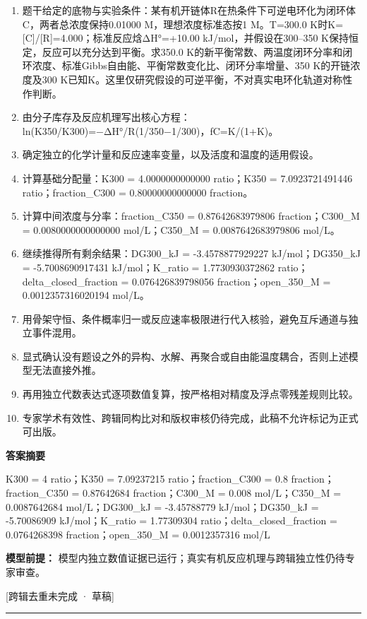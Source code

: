\documentclass[UTF8,11pt,a4paper]{ctexart}
\begin{document}
\begin{enumerate}
\item 题干给定的底物与实验条件：某有机开链体R在热条件下可逆电环化为闭环体C，两者总浓度保持0.01000 M，理想浓度标准态按1 M。T=300.0 K时K=[C]/[R]=4.000；标准反应焓ΔH°=+10.00 kJ/mol，并假设在300–350 K保持恒定，反应可以充分达到平衡。求350.0 K的新平衡常数、两温度闭环分率和闭环浓度、标准Gibbs自由能、平衡常数变化比、闭环分率增量、350 K的开链浓度及300 K已知K。这里仅研究假设的可逆平衡，不对真实电环化轨道对称性作判断。
\item 由分子库存及反应机理写出核心方程：ln(K350/K300)=−ΔH°/R(1/350−1/300)，fC=K/(1+K)。
\item 确定独立的化学计量和反应速率变量，以及活度和温度的适用假设。
\item 计算基础分配量：K300 = 4.0000000000000 ratio；K350 = 7.0923721491446 ratio；fraction\_C300 = 0.80000000000000 fraction。
\item 计算中间浓度与分率：fraction\_C350 = 0.87642683979806 fraction；C300\_M = 0.0080000000000000 mol/L；C350\_M = 0.0087642683979806 mol/L。
\item 继续推得所有剩余结果：DG300\_kJ = -3.4578877929227 kJ/mol；DG350\_kJ = -5.7008690917431 kJ/mol；K\_ratio = 1.7730930372862 ratio；delta\_closed\_fraction = 0.076426839798056 fraction；open\_350\_M = 0.0012357316020194 mol/L。
\item 用骨架守恒、条件概率归一或反应速率极限进行代入核验，避免互斥通道与独立事件混用。
\item 显式确认没有题设之外的异构、水解、再聚合或自由能温度耦合，否则上述模型无法直接外推。
\item 再用独立代数表达式逐项数值复算，按严格相对精度及浮点零残差规则比较。
\item 专家学术有效性、跨辑同构比对和版权审核仍待完成，此稿不允许标记为正式可出版。
\end{enumerate}
\noindent\textbf{答案摘要}\par
K300 = 4 ratio；K350 = 7.09237215 ratio；fraction\_C300 = 0.8 fraction；fraction\_C350 = 0.87642684 fraction；C300\_M = 0.008 mol/L；C350\_M = 0.0087642684 mol/L；DG300\_kJ = -3.45788779 kJ/mol；DG350\_kJ = -5.70086909 kJ/mol；K\_ratio = 1.77309304 ratio；delta\_closed\_fraction = 0.0764268398 fraction；open\_350\_M = 0.0012357316 mol/L\par
\noindent\textbf{模型前提：}
模型内独立数值证据已运行；真实有机反应机理与跨辑独立性仍待专家审查。\par
\noindent\textcolor{red!65!black}{[跨辑去重未完成 · 草稿]} \par
\medskip\hrule\medskip
{}
\end{document}
